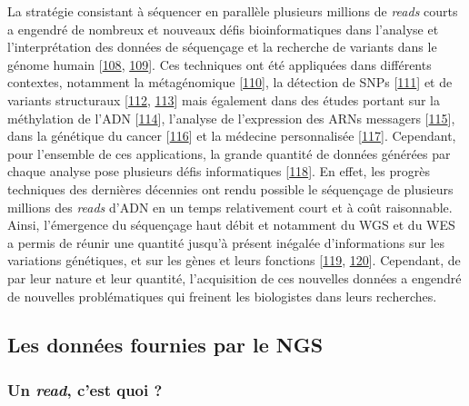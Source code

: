 \documentclass[12pt,twoside]{ugathesis}
\theoremstyle{definition}
\theoremstyle{definition}
\theoremstyle{remark}
\begin{document}
La stratégie consistant à séquencer en parallèle plusieurs millions de
\emph{reads} courts a engendré de nombreux et nouveaux défis
bioinformatiques dans l'analyse et l'interprétation des données de
séquençage et la recherche de variants dans le génome humain
{[}\protect\hyperlink{ref-Wold2007}{108},
\protect\hyperlink{ref-Yang2009}{109}{]}. Ces techniques ont été
appliquées dans différents contextes, notamment la métagénomique
{[}\protect\hyperlink{ref-Qin2010}{110}{]}, la détection de SNPs
{[}\protect\hyperlink{ref-VanTassell2008}{111}{]} et de variants
structuraux {[}\protect\hyperlink{ref-Alkan2010}{112},
\protect\hyperlink{ref-Medvedev2009}{113}{]} mais également dans des
études portant sur la méthylation de l'ADN
{[}\protect\hyperlink{ref-Taylor2007}{114}{]}, l'analyse de l'expression
des ARNs messagers {[}\protect\hyperlink{ref-Sultan2008}{115}{]}, dans
la génétique du cancer {[}\protect\hyperlink{ref-Guffanti2009}{116}{]}
et la médecine personnalisée
{[}\protect\hyperlink{ref-Auffray2009}{117}{]}. Cependant, pour
l'ensemble de ces applications, la grande quantité de données générées
par chaque analyse pose plusieurs défis informatiques
{[}\protect\hyperlink{ref-Horner2009}{118}{]}. En effet, les progrès
techniques des dernières décennies ont rendu possible le séquençage de
plusieurs millions des \emph{reads} d'ADN en un temps relativement court
et à coût raisonnable. Ainsi, l'émergence du séquençage haut débit et
notamment du WGS et du WES a permis de réunir une quantité jusqu'à
présent inégalée d'informations sur les variations génétiques, et sur
les gènes et leurs fonctions {[}\protect\hyperlink{ref-Mardis2008}{119},
\protect\hyperlink{ref-Bentley2006}{120}{]}. Cependant, de par leur
nature et leur quantité, l'acquisition de ces nouvelles données a
engendré de nouvelles problématiques qui freinent les biologistes dans
leurs recherches.

\subsection{Les données fournies par le
NGS}\label{les-donnees-fournies-par-le-ngs}

\subsubsection{\texorpdfstring{Un \emph{read}, c'est quoi
?}{Un read, c'est quoi ?}}\label{un-read-cest-quoi}
\end{document}
